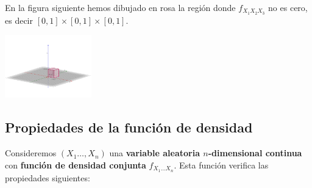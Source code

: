 \documentclass[
  letterpaper,
  DIV=11,
  numbers=noendperiod]{scrreprt}
\begin{document}
En la figura siguiente hemos dibujado en rosa la región donde
\(f_{X_1X_2X_3}\) no es cero, es decir
\([0,1]\times [0,1]\times [0,1]\).

\includegraphics[width=1.48in,height=\textheight]{Images/Cubo3D2.png}

\hypertarget{propiedades-de-la-funciuxf3n-de-densidad-1}{%
\subsection{Propiedades de la función de
densidad}\label{propiedades-de-la-funciuxf3n-de-densidad-1}}

Consideremos \((X_1\ldots,X_n)\) una \textbf{variable aleatoria
\(n\)-dimensional continua} con \textbf{función de densidad conjunta}
\(f_{X_1\ldots X_n}\). Esta función verifica las propiedades siguientes:
\end{document}

